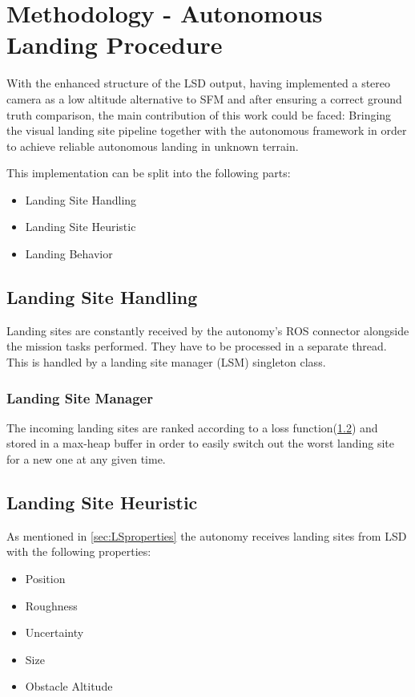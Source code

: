 \chapter{Methodology - Autonomous Landing Procedure}\label{chapter:core_implementation}


With the enhanced structure of the LSD output, having implemented a stereo camera as a low altitude alternative to SFM and after ensuring a correct ground truth comparison, the main contribution of this work could be faced: Bringing the visual landing site pipeline together with the autonomous framework in order to achieve reliable autonomous landing in unknown terrain.

This implementation can be split into the following parts:
\begin{itemize}
    \item Landing Site Handling
    \item Landing Site Heuristic
    \item Landing Behavior
\end{itemize}

\section{Landing Site Handling}

Landing sites are constantly received by the autonomy's ROS connector alongside the mission tasks performed. They have to be processed in a separate thread. This is handled by a landing site manager (LSM) singleton class.

\subsection{Landing Site Manager}

The incoming landing sites are ranked according to a loss function(\ref{subsubsec:LandingSiteHeuristic}) and stored in a max-heap buffer in order to easily switch out the worst landing site for a new one at any given time.

\section{Landing Site Heuristic}\label{subsubsec:LandingSiteHeuristic}

As mentioned in \cref{sec:LSproperties} the autonomy receives landing sites from LSD with the following properties:

\begin{itemize}
    \item Position
    \item Roughness
    \item Uncertainty
    \item Size
    \item Obstacle Altitude
\end{itemize}

